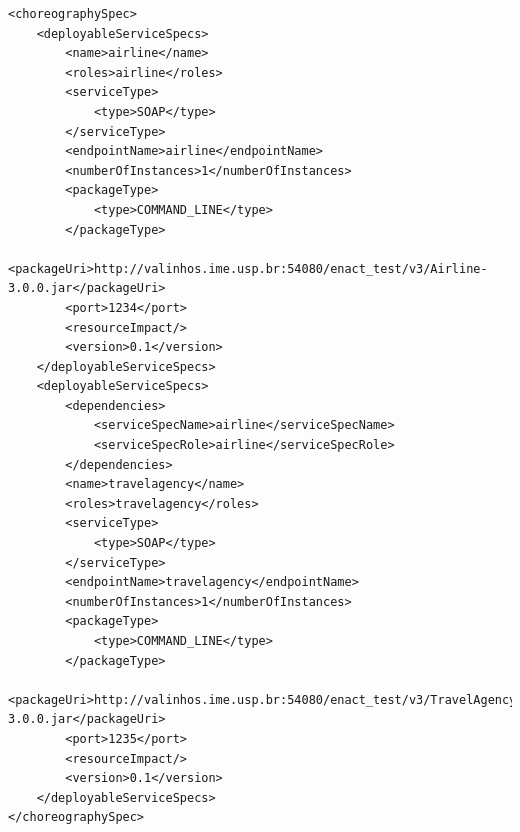 {\footnotesize
\lstset{language=XML}
\begin{lstlisting}[breaklines, caption=ChorSpec XML representation example., label=lst:chor_spec_xml]
<choreographySpec>
    <deployableServiceSpecs>
        <name>airline</name>
        <roles>airline</roles>
        <serviceType>
            <type>SOAP</type>
        </serviceType>
        <endpointName>airline</endpointName>
        <numberOfInstances>1</numberOfInstances>
        <packageType>
            <type>COMMAND_LINE</type>
        </packageType>
        <packageUri>http://valinhos.ime.usp.br:54080/enact_test/v3/Airline-3.0.0.jar</packageUri>
        <port>1234</port>
        <resourceImpact/>
        <version>0.1</version>
    </deployableServiceSpecs>
    <deployableServiceSpecs>
        <dependencies>
            <serviceSpecName>airline</serviceSpecName>
            <serviceSpecRole>airline</serviceSpecRole>
        </dependencies>
        <name>travelagency</name>
        <roles>travelagency</roles>
        <serviceType>
            <type>SOAP</type>
        </serviceType>
        <endpointName>travelagency</endpointName>
        <numberOfInstances>1</numberOfInstances>
        <packageType>
            <type>COMMAND_LINE</type>
        </packageType>
        <packageUri>http://valinhos.ime.usp.br:54080/enact_test/v3/TravelAgency-3.0.0.jar</packageUri>
        <port>1235</port>
        <resourceImpact/>
        <version>0.1</version>
    </deployableServiceSpecs>
</choreographySpec>
\end{lstlisting}

}
